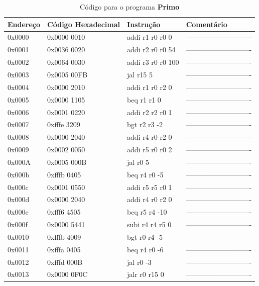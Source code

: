 \documentclass[12pt]{article}
\begin{document}
\begin{table}[H]
    \centering
    \caption{Código para o programa \textbf{Primo}}
    \begin{tabular}{|l|l|l|l|}\hline
        \textbf{Endereço} & \textbf{Código Hexadecimal} & \textbf{Instrução} & \textbf{Comentário} \\\hline
        0x0000 & 0x0000 0010 & addi r1 r0 r0 0   & ----------------------------\\\hline
        0x0001 & 0x0036 0020 & addi r2 r0 r0 54  & ----------------------------\\\hline
        0x0002 & 0x0064 0030 & addi r3 r0 r0 100 & ----------------------------\\\hline
        0x0003 & 0x0005 00FB & jal r15 5         & ----------------------------\\\hline
        0x0004 & 0x0000 2010 & addi r1 r0 r2 0   & ----------------------------\\\hline
        0x0005 & 0x0000 1105 & beq r1 r1 0       & ----------------------------\\\hline
        0x0006 & 0x0001 0220 & addi r2 r2 r0 1   & ----------------------------\\\hline
        0x0007 & 0xfffe 3209 & bgt r2 r3 -2      & ----------------------------\\\hline
        0x0008 & 0x0000 2040 & addi r4 r0 r2 0   & ----------------------------\\\hline
        0x0009 & 0x0002 0050 & addi r5 r0 r0 2   & ----------------------------\\\hline
        0x000A & 0x0005 000B & jal r0 5          & ----------------------------\\\hline
        0x000b & 0xfffb 0405 & beq r4 r0 -5      & ----------------------------\\\hline %
        0x000c & 0x0001 0550 & addi r5 r5 r0 1   & ----------------------------\\\hline
        0x000d & 0x0000 2040 & addi r4 r0 r2 0   & ----------------------------\\\hline
        0x000e & 0xfff6 4505 & beq r5 r4 -10     & ----------------------------\\\hline
        0x000f & 0x0000 5441 & subi r4 r4 r5 0   & ----------------------------\\\hline
        0x0010 & 0xfffb 4009 & bgt r0 r4 -5      & ----------------------------\\\hline
        0x0011 & 0xfffa 0405 & beq r4 r0 -6      & ----------------------------\\\hline
        0x0012 & 0xfffd 000B & jal r0 -3         & ----------------------------\\\hline
        0x0013 & 0x0000 0F0C & jalr r0 r15 0     & ----------------------------\\\hline
    \end{tabular}\label{tab:programs:primo}
\end{table}
\end{document}
